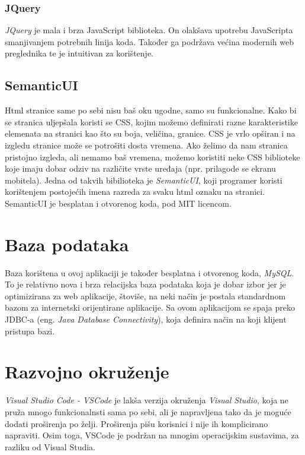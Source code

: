 \documentclass[zavrsni, numeric]{fer}
\begin{document}
\subsubsection{JQuery}
\textit{JQuery}\citep{jquery} je mala i brza JavaScript biblioteka. On olakšava upotrebu JavaScripta smanjivanjem potrebnih linija koda. Također ga podržava većina modernih web preglednika te je intuitivan za korištenje.

\subsection{SemanticUI}
Html stranice same po sebi nisu baš oku ugodne, samo su funkcionalne. Kako bi se stranica uljepšala koristi se CSS, kojim možemo definirati razne karakteristike elemenata na stranici kao što su boja, veličina, granice. CSS je vrlo opširan i na izgledu stranice može se potrošiti dosta vremena. Ako želimo da nam stranica pristojno izgleda, ali nemamo baš vremena, možemo koristiti neke CSS biblioteke koje imaju dobar odziv na različite vrste uređaja (npr. prilagode se ekranu mobitela). Jedna od takvih bibilioteka je \textit{SemanticUI}\citep{semantic}, koji programer koristi korištenjem postojećih imena razreda za svaku html oznaku na stranici. SemanticUI je besplatan i otvorenog koda, pod MIT licencom.

\section{Baza podataka}
Baza korištena u ovoj aplikaciji je također besplatna i otvorenog koda, \textit{MySQL}\citep{mysql}. To je relativno nova i brza relacijska baza podataka koja je dobar izbor jer je optimizirana za web aplikacije, štoviše, na neki način je postala standardnom bazom za internetski orijentirane aplikacije. Sa ovom aplikacijom se spaja preko JDBC-a (eng. \textit{Java Database Connectivity}), koja definira način na koji klijent pristupa bazi.

\section{Razvojno okruženje}
\textit{Visual Studio Code - VSCode}\citep{vscode} je lakša verzija okruženja \textit{Visual Studio}, koja ne pruža mnogo funkcionalnsti sama po sebi, ali je napravljena tako da je moguće dodati proširenja po želji. Proširenja pišu korisnici i nije ih komplicirano napraviti. Osim toga, VSCode je podržan na mnogim operacijskim sustavima, za razliku od Visual Studia.
\end{document}
